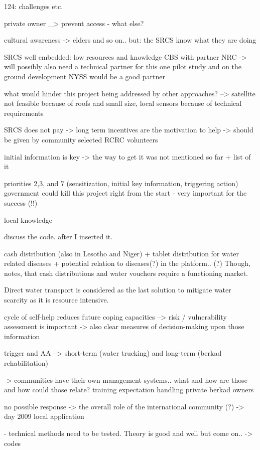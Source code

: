 124: challenges etc.

private owner _> prevent access - what else?

cultural awareness -> elders and so on.. but: the SRCS know what they are doing


SRCS well embedded: low resources and knowledge
CBS with partner NRC -> will possibly also need a technical partner for this one
pilot study and on the ground development
NYSS would be a good partner

what would hinder this project being addressed by other approaches? --> satellite not feasible because of roofs and small size, local sensors because of technical requirements

SRCS does not pay -> long term incentives are the motivation to help -> should be given by community selected RCRC volunteers

initial information is key -> the way to get it was not mentioned so far + list of it

priorities 2,3, and 7 (sensitization, initial key information, triggering action)
government could kill this project right from the start - very important for the success (!!)

local knowledge

discuss the code. after I inserted it.

cash distribution (also in Lesotho and Niger)
+ tablet distribution for water related diseases
+ potential relation to diseases(?) in the platform.. (?)
Though, \autocite{gualazziniEWEAEarlyWarning2021} notes, that cash distributions and water vouchers require a functioning market.

Direct water transport is considered as the last solution to mitigate water scarcity as it is resource intensive. 

cycle of self-help reduces future coping capacities
--> risk / vulnerability assessment is important -> also clear measures of decision-making upon those information

trigger and AA --> short-term (water trucking) and long-term (berkad rehabilitation)

-> communities have their own management systems.. what and how are those and how could those relate?
training
expectation handling
private berkad owners

no possible response -> the overall role of the international community (?)
-> day 2009 local application


- technical methods need to be tested. Theory is good and well but come on.. 
-> codes


